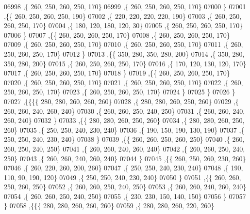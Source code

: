 \begin{DoxyCode}
06998     ,\{   260,   250,   260,   250,   170\}
06999     ,\{   260,   250,   260,   250,   170\}
07000     \}
07001    ,\{\{   260,   250,   260,   250,   190\}
07002     ,\{   220,   220,   220,   220,   190\}
07003     ,\{   260,   250,   260,   250,   170\}
07004     ,\{   180,   120,   180,   120,    30\}
07005     ,\{   260,   250,   260,   250,   170\}
07006     \}
07007    ,\{\{   260,   250,   260,   250,   170\}
07008     ,\{   260,   250,   260,   250,   170\}
07009     ,\{   260,   250,   260,   250,   170\}
07010     ,\{   260,   250,   260,   250,   170\}
07011     ,\{   260,   250,   260,   250,   170\}
07012     \}
07013    ,\{\{   350,   280,   350,   280,   200\}
07014     ,\{   350,   280,   350,   280,   200\}
07015     ,\{   260,   250,   260,   250,   170\}
07016     ,\{   170,   120,   130,   120,   170\}
07017     ,\{   260,   250,   260,   250,   170\}
07018     \}
07019    ,\{\{   260,   250,   260,   250,   170\}
07020     ,\{   260,   250,   260,   250,   170\}
07021     ,\{   260,   250,   260,   250,   170\}
07022     ,\{   260,   250,   260,   250,   170\}
07023     ,\{   260,   250,   260,   250,   170\}
07024     \}
07025    \}
07026   \}
07027  ,\{\{\{\{   280,   280,   260,   260,   260\}
07028     ,\{   280,   280,   260,   250,   260\}
07029     ,\{   260,   260,   240,   260,   240\}
07030     ,\{   260,   260,   250,   240,   250\}
07031     ,\{   260,   260,   240,   260,   240\}
07032     \}
07033    ,\{\{   280,   280,   260,   250,   260\}
07034     ,\{   280,   280,   260,   250,   260\}
07035     ,\{   250,   250,   240,   230,   240\}
07036     ,\{   190,   150,   190,   130,   190\}
07037     ,\{   250,   250,   240,   230,   240\}
07038     \}
07039    ,\{\{   260,   260,   250,   260,   250\}
07040     ,\{   260,   260,   250,   240,   250\}
07041     ,\{   260,   260,   240,   260,   240\}
07042     ,\{   260,   260,   250,   240,   250\}
07043     ,\{   260,   260,   240,   260,   240\}
07044     \}
07045    ,\{\{   260,   250,   260,   230,   260\}
07046     ,\{   260,   220,   260,   200,   260\}
07047     ,\{   250,   250,   240,   230,   240\}
07048     ,\{   190,   110,    90,   190,   120\}
07049     ,\{   250,   250,   240,   230,   240\}
07050     \}
07051    ,\{\{   260,   260,   250,   260,   250\}
07052     ,\{   260,   260,   250,   240,   250\}
07053     ,\{   260,   260,   240,   260,   240\}
07054     ,\{   260,   260,   250,   240,   250\}
07055     ,\{   230,   230,   150,   140,   150\}
07056     \}
07057    \}
07058   ,\{\{\{   280,   280,   260,   260,   260\}
07059     ,\{   280,   280,   260,   220,   260\}

\end{DoxyCode}
